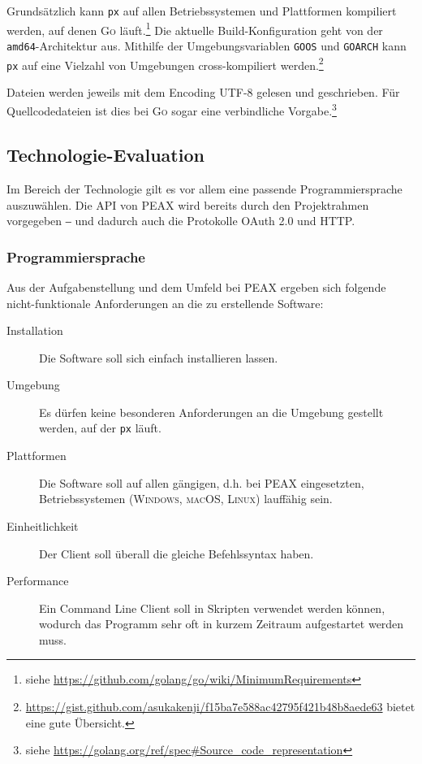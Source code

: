 Grundsätzlich kann \texttt{px} auf allen Betriebssystemen und Plattformen kompiliert werden, auf denen \textsc{Go} läuft.\footnote{siehe \url{https://github.com/golang/go/wiki/MinimumRequirements}} Die aktuelle Build-Konfiguration geht von der \texttt{amd64}-Architek\-tur aus. Mithilfe der Umgebungsvariablen \texttt{GOOS} und \texttt{GOARCH} kann \texttt{px} auf eine Vielzahl von Umgebungen cross-kompiliert werden.\footnote{\url{https://gist.github.com/asukakenji/f15ba7e588ac42795f421b48b8aede63} bietet eine gute Übersicht.}

Dateien werden jeweils mit dem Encoding UTF-8 gelesen und geschrieben. Für Quellcodedateien ist dies bei \textsc{Go} sogar eine verbindliche Vorgabe.\footnote{siehe \url{https://golang.org/ref/spec\#Source_code_representation}}

\subsection{Technologie-Evaluation}

Im Bereich der Technologie gilt es vor allem eine passende Programmiersprache auszuwählen. Die API von PEAX wird bereits durch den Projektrahmen vorgegeben ‒ und dadurch auch die Protokolle OAuth 2.0 und HTTP.

\subsubsection{Programmiersprache}

Aus der Aufgabenstellung und dem Umfeld bei PEAX ergeben sich folgende nicht-funktio\-nale Anforderungen an die zu erstellende Software:

\begin{description}
    \item[Installation] Die Software soll sich einfach installieren lassen.
    \item[Umgebung] Es dürfen keine besonderen Anforderungen an die Umgebung gestellt werden, auf der \texttt{px} läuft.
    \item[Plattformen] Die Software soll auf allen gängigen, d.h. bei PEAX eingesetzten, Betriebssystemen (\textsc{Windows}, \textsc{macOS}, \textsc{Linux}) lauffähig sein.
    \item[Einheitlichkeit] Der Client soll überall die gleiche Befehlssyntax haben.
    \item[Performance] Ein Command Line Client soll in Skripten verwendet werden können, wodurch das Programm sehr oft in kurzem Zeitraum aufgestartet werden muss.
\end{description}


